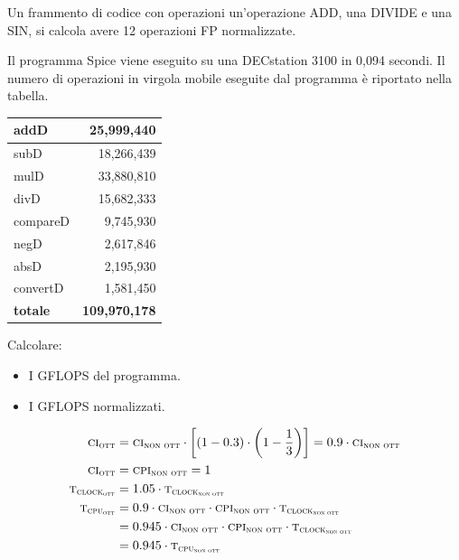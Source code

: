 Un frammento di codice con operazioni un'operazione ADD, una DIVIDE e una SIN, si calcola avere 12 operazioni FP normalizzate.
\newpage
\begin{exercise}
	Il programma Spice viene eseguito su una DECstation 3100 in 0,094 secondi. Il numero di operazioni in virgola mobile eseguite dal programma è riportato nella tabella.
	\begin{table}[ht]
		\centering
		\scriptsize
		\begin{tabular}{|l|r|}
			\hline
			addD & 25,999,440
			\\\hline
			subD & 18,266,439
			\\\hline
			mulD & 33,880,810
			\\\hline
			divD & 15,682,333
			\\\hline
			compareD & 9,745,930
			\\\hline
			negD & 2,617,846
			\\\hline
			absD & 2,195,930
			\\\hline
			convertD & 1,581,450
			\\\hline
			\textbf{totale} & \textbf{109,970,178}
			\\\hline
		\end{tabular}
	\end{table}
	Calcolare:
	\begin{itemize}
		\item I GFLOPS del programma.
		\item I GFLOPS normalizzati.
	\end{itemize}
\end{exercise}
\begin{solution}
	\begin{align*}
		\textsc{ci\textsubscript{ott}} &= \textsc{ci\textsubscript{non ott}}\cdot \left[(1-0.3)\cdot \left(1-\frac{1}{3}\right)\right]=0.9 \cdot \textsc{ci\textsubscript{non ott}}\\
		\textsc{ci\textsubscript{ott}} &= \textsc{cpi\textsubscript{non ott}}=1\\
		\textsc{t\textsubscript{\textsc{clock\textsubscript{ott}}}} &= 1.05 \cdot \textsc{t\textsubscript{\textsc{clock\textsubscript{non ott}}}}\\
		\textsc{t\textsubscript{cpu\textsubscript{ott}}} &= 0.9 \cdot \textsc{ci\textsubscript{non ott}} \cdot \textsc{cpi\textsubscript{\textsc{non ott}}}\cdot\textsc{t\textsubscript{clock\textsubscript{non ott}}}\\
		&=0.945 \cdot \textsc{ci\textsubscript{non ott}}\cdot \textsc{cpi\textsubscript{non ott}}\cdot \textsc{t\textsubscript{clock\textsubscript{non ott}}}\\
		&= 0.945 \cdot \textsc{t\textsubscript{cpu\textsubscript{non ott}}}
	\end{align*}
\end{solution}














